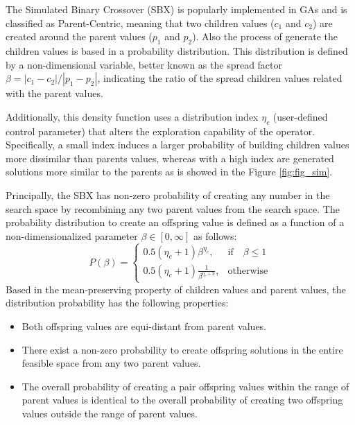 The Simulated Binary Crossover (SBX) \cite{deb1994simulated} is popularly implemented in GAs \cite{Joel:NSGAII,Joel:SMSEMOA} and is classified as Parent-Centric, meaning that two children values ($c_1$ and $c_2$) are created around the parent values ($p_1$ and $p_2$).
%
Also the process of generate the children values is based in a probability distribution.
%
This distribution is defined by a non-dimensional variable, better known as the spread factor $\beta = |c_1 - c_2 | / |p_1 - p_2|$, indicating the ratio of the spread children values related with the parent values.
%

Additionally, this density function uses a distribution index $\eta_c$ (user-defined control parameter) that alters the exploration capability of the operator.
%
Specifically, a small index induces a larger probability of building children values more dissimilar than parents values, whereas with a high index are generated solutions more similar to the parents as is showed in the Figure \ref{fig:fig_sim}.
%

Principally, the SBX has non-zero probability of creating any number in the search space by recombining any two parent values from the search space.
%
The probability distribution to create an offspring value is defined as a function of a non-dimensionalized parameter $\beta \in [0, \infty]$ as follows:
%
\begin{equation}
    P(\beta)= 
\begin{cases}
     0.5(\eta_c + 1)\beta^{\eta_c},& \text{if} \quad \beta \leq 1\\
     0.5(\eta_c + 1) \frac{1}{\beta^{\eta_c + 2}} ,& \text{otherwise}
\end{cases}
\end{equation}
%
Based in the mean-preserving property of children values and parent values, the distribution probability has the following properties:
\begin{itemize}
\item Both offspring values are equi-distant from parent values.
\item There exist a non-zero probability to create offspring solutions in the entire feasible space from any two parent values.
\item The overall probability of creating a pair offspring values within the range of parent values is identical to the overall probability of creating two offspring values outside  the range of parent values.
\end{itemize}


